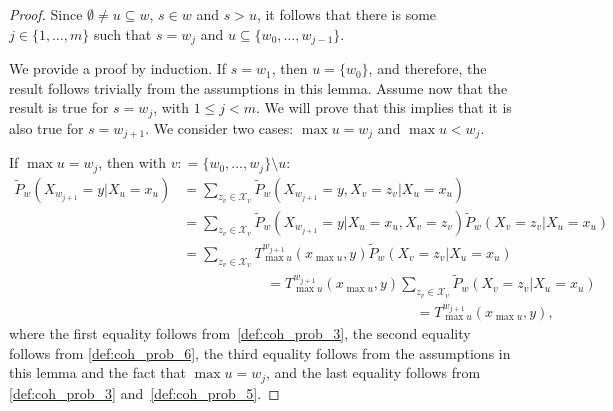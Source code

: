 \documentclass[10pt,a4paper]{paper}
\theoremstyle{definition}
\newcommand{\states}{\mathcal{X}}
\newcommand{\coloneqq}{:\!=}
\begin{document}
\begin{proof}
Since $\emptyset\neq u\subseteq w$, $s\in w$ and $s>u$, it follows that there is some $j\in\{1,\dots,m\}$ such that $s=w_j$ and $u\subseteq\{w_0,\dots,w_{j-1}\}$.

We provide a proof by induction. If $s=w_1$, then $u=\{w_0\}$, and therefore, the result follows trivially from the assumptions in this lemma. Assume now that the result is true for $s=w_j$, with $1\leq j<m$. We will prove that this implies that it is also true for $s=w_{j+1}$. We consider two cases: $\max u=w_j$ and $\max u<w_j$.

If $\max u=w_j$, then with $v\coloneqq\{w_0,\dots,w_j\}\setminus u$:
\begin{align*}
\tilde{P}_w(X_{w_{j+1}}=y\vert X_u=x_u)
&=\sum_{z_{v}\in\states_{v}}\tilde{P}_w(X_{w_{j+1}}=y, X_{v}=z_{v}\vert X_u=x_u)\\
&=\sum_{z_{v}\in\states_{v}}
\tilde{P}_w(X_{w_{j+1}}=y\vert X_u=x_u, X_{v}=z_{v})
\tilde{P}_w(X_{v}=z_{v}\vert X_u=x_u)\\
&=\sum_{z_{v}\in\states_{v}}
T_{\max u}^{w_{j+1}}(x_{\max u},y)
\tilde{P}_w(X_{v}=z_{v}\vert X_u=x_u)\\[-1mm]
&\quad\quad\quad\quad\quad\quad
=T_{\max u}^{w_{j+1}}(x_{\max u},y)
\sum_{z_{v}\in\states_{v}}
\tilde{P}_w(X_{v}=z_{v}\vert X_u=x_u)\\[-1mm]
&\quad\quad\quad\quad\quad\quad\quad\quad\quad\quad\quad\quad\quad\quad\quad\quad~~~
=T_{\max u}^{w_{j+1}}(x_{\max u},y),
\end{align*}
where the first equality follows from~\ref{def:coh_prob_3}, the second equality follows from \ref{def:coh_prob_6}, the third equality follows from the assumptions in this lemma and the fact that $\max u=w_j$, and the last equality follows from \ref{def:coh_prob_3} and~\ref{def:coh_prob_5}.


\end{proof}
\end{document}
